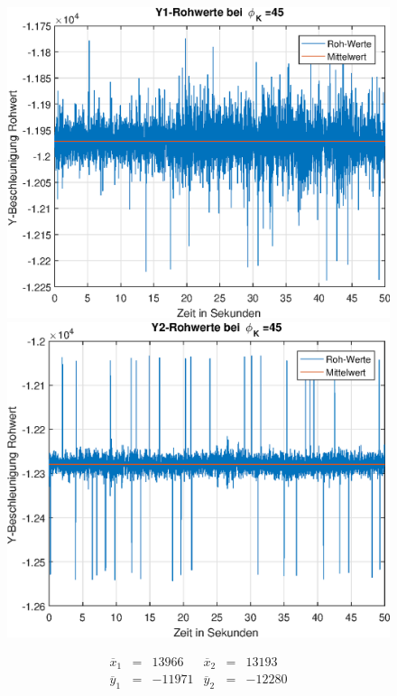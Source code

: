\documentclass{article}
\begin{document}
\begin{figure}[h]
	\includegraphics[width=0.5\linewidth]{img/phiK45_y1_raw.eps}
	\includegraphics[width=0.5\linewidth]{img/phiK45_y2_raw.eps}
\end{figure}

\begin{equation}
\begin{array}{lclclcl}
\overline{x}_1 &=& 13966 & \overline{x}_2 &=& 13193 \\
\overline{y}_1 &=& -11971 & \overline{y}_2 &=& -12280
\end{array}
\end{equation}
\end{document}
